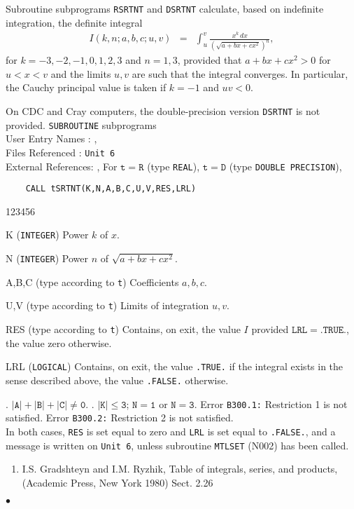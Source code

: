                          
                
\Submitter{}                     
Subroutine subprograms {\tt RSRTNT} and {\tt DSRTNT} calculate, based on
indefinite integration, the definite integral
\begin{eqnarray*}
I(k,n;a,b,c;u,v) & = & \displaystyle \int_u^v
\frac{x^k\,dx}{(\sqrt{a+bx+cx^2})^n},
\end{eqnarray*}
for $k=-3,-2,-1,0,1,2,3$ and $n=1,3$, provided that
$a+bx+cx^2 > 0$ for $u < x < v$ and the limits $u,v$ are such that
the integral converges. In particular, the Cauchy principal value
is taken if $k=-1$ and $uv < 0$.

On CDC and Cray computers, the double-precision version {\tt DSRTNT}
is not provided.
\Structure
{\tt SUBROUTINE} subprograms \\
User Entry   Names : , \\
Files  Referenced : {\tt Unit 6} \\
External References: , 
\Usage
For $\mathtt{t=R}$ (type {\tt REAL}), $\mathtt{t=D}$ (type
{\tt DOUBLE PRECISION}),
\begin{verbatim}
    CALL tSRTNT(K,N,A,B,C,U,V,RES,LRL)
\end{verbatim}
\begin{DLtt}{123456}
\item[K] ({\tt INTEGER}) Power $k$ of $x$.
\item[N] ({\tt INTEGER}) Power $n$ of $\sqrt{a+bx+cx^2}$.
\item[A,B,C] (type according to {\tt t}) Coefficients $a,b,c$.
\item[U,V] (type according to {\tt t}) Limits of integration $u,v$.
\item[RES] (type according to {\tt t}) Contains, on exit, the value
$I$ provided $\mathtt{LRL = .TRUE.}$, the value zero otherwise.
\item[LRL] ({\tt LOGICAL}) Contains, on exit, the value {\tt .TRUE.}
if the integral exists in the sense described above, the value
{\tt .FALSE.} otherwise.
\end{DLtt}
. \quad $\mathtt{|A|+|B|+|C| \ne 0}.$  . \quad $\mathtt{|K| \le 3}$; \quad
$\mathtt{N = 1}$ or $\mathtt{N = 3}$.
\Errorh
Error {\tt B300.1:} Restriction 1 is not satisfied.
Error {\tt B300.2:} Restriction 2 is not satisfied. \\
In both cases, {\tt RES} is set equal to zero and {\tt LRL} is set
equal to {\tt .FALSE.}, and a message is written on {\tt Unit 6},
unless subroutine {\tt MTLSET} (N002) has been called.
\Refer
\begin{enumerate}
\item  I.S. Gradshteyn and I.M. Ryzhik, Table of integrals, series,
and products, (Academic Press, New York 1980) Sect. 2.26
\end{enumerate}
$\bullet$
